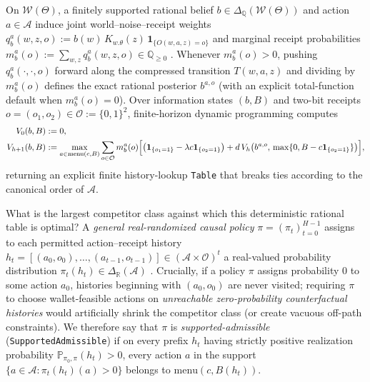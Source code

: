\documentclass[11pt,a4paper]{article}
\begin{document}
On \(\mathcal{W}(\Theta)\), a finitely supported rational belief
\(b \in \Delta_{\mathbb{Q}}(\mathcal{W}(\Theta))\) and action
\(a \in \mathcal{A}\) induce joint world--noise--receipt weights
\(q_b^a(w, z, o) := b(w)\, K_{w.\theta}(z)\, \mathbf{1}_{\{O(w,a,z) = o\}}\)
and marginal receipt probabilities
\(m_b^a(o) := \sum_{w,z} q_b^a(w, z, o) \in \mathbb{Q}_{\ge 0}\)
\citep{sondik1978, bertsekas2017}. Whenever \(m_b^a(o) > 0\), pushing
\(q_b^a(\cdot, \cdot, o)\) forward along the compressed transition
\(T(w,a,z)\) and dividing by \(m_b^a(o)\) defines the exact rational
posterior \(b^{a,o}\) (with an explicit total-function default when
\(m_b^a(o) = 0\)). Over information states \((b, B)\) and two-bit
receipts \(o = (o_1, o_2) \in \mathcal{O} := \{0,1\}^2\), finite-horizon
dynamic programming computes \[\begin{aligned}
V_0(b, B) &:= 0, \\
V_{h+1}(b, B) &:= \max_{a \in \mathrm{menu}(c, B)} \sum_{o \in \mathcal{O}} m_b^a(o)\Bigl[\bigl(\mathbf{1}_{\{o_1 = 1\}} - \lambda c \mathbf{1}_{\{o_2 = 1\}}\bigr) + d\, V_h\bigl(b^{a,o},\, \max\{0, B - c\mathbf{1}_{\{o_2 = 1\}}\}\bigr)\Bigr],
\end{aligned}\] returning an explicit finite history-lookup
\texttt{Table} that breaks ties according to the canonical order of
\(\mathcal{A}\).

What is the largest competitor class against which this deterministic
rational table is optimal? A \emph{general real-randomized causal
policy} \(\pi = (\pi_t)_{t=0}^{H-1}\) assigns to each permitted
action--receipt history
\(h_t = [(a_0, o_0), \dots, (a_{t-1}, o_{t-1})] \in (\mathcal{A} \times \mathcal{O})^t\)
a real-valued probability distribution
\(\pi_t(h_t) \in \Delta_{\mathbb{R}}(\mathcal{A})\)
\citep{dynkin1965, blackwell1965, hinderer1970, hernandezLerma1996, kallenberg2021}.
Crucially, if a policy \(\pi\) assigns probability \(0\) to some action
\(a_0\), histories beginning with \((a_0, o_0)\) are never visited;
requiring \(\pi\) to choose wallet-feasible actions on \emph{unreachable
zero-probability counterfactual histories} would artificially shrink the
competitor class (or create vacuous off-path constraints). We therefore
say that \(\pi\) is \emph{supported-admissible}
(\texttt{SupportedAdmissible}) if on every prefix \(h_t\) having
strictly positive realization probability
\(\mathbb{P}_{\pi_0, \pi}(h_t) > 0\), every action \(a\) in the support
\(\{a \in \mathcal{A} : \pi_t(h_t)(a) > 0\}\) belongs to
\(\mathrm{menu}(c, B(h_t))\).
\end{document}
